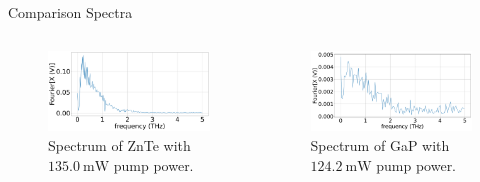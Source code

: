 \documentclass[aspectratio=1610, 9pt]{beamer}
\begin{document}
\begin{frame}{Comparison Spectra}
  \begin{columns}
    \begin{column}{.5\textwidth}
      \begin{center}
        \begin{figure}
          \includegraphics[width=\textwidth]{images/2_11_30_20normalFX.pdf}
          \caption{\textcolor{tugreen}{Spectrum} of ZnTe with $\SI{135.0}{\milli\W}$ pump power.}
        \end{figure}
      \end{center}
  \end{column}
  \begin{column}{.5\textwidth}
    \begin{center}
      \begin{figure}
        \includegraphics[width=\textwidth]{images/GaP14_55_42normalFX.pdf}
        \caption{\textcolor{tugreen}{Spectrum} of GaP with $\SI{124.2}{\milli\W }$ pump power.}
      \end{figure}  
    \end{center}  
  \end{column}
  \end{columns}
\end{frame}
\end{document}

